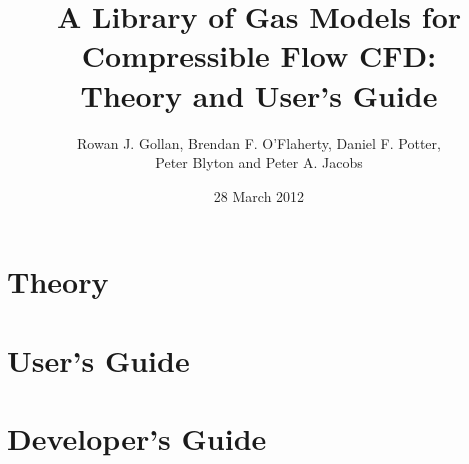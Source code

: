 \documentclass[11pt,twoside,a4paper]{report}
\title{\textsf{A Library of Gas Models for Compressible Flow CFD:\\
       Theory and User's Guide}}
\author{\textsf{Rowan J. Gollan, Brendan F. O'Flaherty, Daniel F. Potter,}\\
        \textsf{Peter Blyton and Peter A. Jacobs}}
\date{\textsf{28 March 2012}}
\begin{document}
\maketitle

\tableofcontents
\listoffigures
\listoftables



\part{Theory}






\part{User's Guide}







\part{Developer's Guide}




\renewcommand\bibname{References}



\appendix





\end{document}
